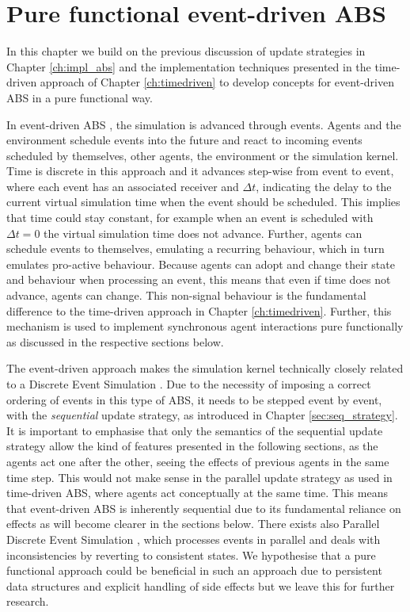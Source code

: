 \chapter{Pure functional event-driven ABS}
\label{ch:eventdriven}
In this chapter we build on the previous discussion of update strategies in Chapter \ref{ch:impl_abs} and the implementation techniques presented in the time-driven approach of Chapter \ref{ch:timedriven} to develop concepts for event-driven ABS in a pure functional way. 

\medskip

In event-driven ABS \cite{meyer_event-driven_2014}, the simulation is advanced through events. Agents and the environment schedule events into the future and react to incoming events scheduled by themselves, other agents, the environment or the simulation kernel. Time is discrete in this approach and it advances step-wise from event to event, where each event has an associated receiver and $\Delta t$, indicating the delay to the current virtual simulation time when the event should be scheduled. This implies that time could stay constant, for example when an event is scheduled with $\Delta t = 0$ the virtual simulation time does not advance. Further, agents can schedule events to themselves, emulating a recurring behaviour, which in turn emulates pro-active behaviour. Because agents can adopt and change their state and behaviour when processing an event, this means that even if time does not advance, agents can change. This non-signal behaviour is the fundamental difference to the time-driven approach in Chapter \ref{ch:timedriven}. Further, this mechanism is used to implement synchronous agent interactions pure functionally as discussed in the respective sections below.

The event-driven approach makes the simulation kernel technically closely related to a Discrete Event Simulation \cite{zeigler_theory_2000}. Due to the necessity of imposing a correct ordering of events in this type of ABS, it needs to be stepped event by event, with the \textit{sequential} update strategy, as introduced in Chapter \ref{sec:seq_strategy}. It is important to emphasise that only the semantics of the sequential update strategy allow the kind of features  presented in the following sections, as the agents act one after the other, seeing the effects of previous agents in the same time step. This would not make sense in the parallel update strategy as used in time-driven ABS, where agents act conceptually at the same time. This means that event-driven ABS is inherently sequential due to its fundamental reliance on effects as will become clearer in the sections below. There exists also Parallel Discrete Event Simulation \cite{fujimoto_parallel_1990}, which processes events in parallel and deals with inconsistencies by reverting to consistent states. We hypothesise that a pure functional approach could be beneficial in such an approach due to persistent data structures and explicit handling of side effects but we leave this for further research.

